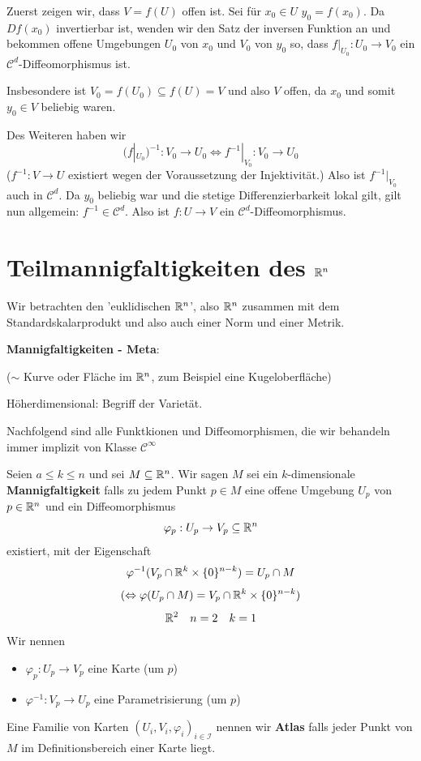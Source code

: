 \documentclass[main.tex]{subfiles}
\begin{document}
\begin{Beweis}
  Zuerst zeigen wir, dass $V = f(U)$ offen ist. Sei für $x_0 \in U$ $y_0 = f(x_0)$. Da $Df(x_0)$ invertierbar ist, wenden wir den Satz der inversen Funktion an und bekommen offene Umgebungen $U_0$ von $x_0$ und $V_0$ von $y_0$ so, dass $f|_{U_0} : U_0 \to V_0$ ein $\mathcal{C}^d$-Diffeomorphismus ist.

  Insbesondere ist $V_0 = f(U_0) \subseteq f(U) = V$ und also $V$ offen, da $x_0$ und somit $y_0 \in V$ beliebig waren.

  Des Weiteren haben wir
  $$(f|_{U_0})^{-1}: V_0 \to U_0 \Leftrightarrow f^{-1}|_{V_0}: V_0 \to U_0$$
  ($f^{-1}: V \to U$ existiert wegen der Voraussetzung der Injektivität.) Also ist $f^{-1}|_{V_0}$ auch in $\mathcal{C}^d$. Da $y_0$ beliebig war und die stetige Differenzierbarkeit lokal gilt, gilt nun allgemein: $f^{-1} \in \mathcal{C}^d$. Also ist $f: U \to V$ ein $\mathcal{C}^d$-Diffeomorphismus.
\end{Beweis}


\section{Teilmannigfaltigkeiten des $\mathbb{R}^n$}

Wir betrachten den 'euklidischen $\mathbb{R}^n$', also $\mathbb{R}^n$ zusammen mit dem Standardskalarprodukt und also auch einer Norm und einer Metrik.

\begin{Bemerkung}
  \textbf{Mannigfaltigkeiten - Meta}:

  ($\sim$ Kurve oder Fläche im $\mathbb{R}^n$, zum Beispiel eine Kugeloberfläche)

  Höherdimensional: Begriff der Varietät.
\end{Bemerkung}

\begin{Bemerkung}[Voraussetzung]
  Nachfolgend sind alle Funktkionen und Diffeomorphismen, die wir behandeln immer implizit von Klasse $\mathcal{C}^\infty$
\end{Bemerkung}

\begin{Definition}[Mannigfaltigkeit]
  Seien $a \leq k \leq n$ und sei $M \subseteq \mathbb{R}^n$. Wir sagen $M$ sei ein $k$-dimensionale \textbf{Mannigfaltigkeit} falls zu jedem Punkt $p \in M$ eine offene Umgebung $U_p$ von $p \in \mathbb{R}^n$ und ein Diffeomorphismus
  $$\varphi_p : U_p \to V_p \subseteq \mathbb{R}^n$$
  existiert, mit der Eigenschaft
  $$\varphi^{-1} (V_p \cap \mathbb{R}^k \times \{0\}^{n-k}) = U_p \cap M$$
  $$(\Leftrightarrow \varphi(U_p \cap M) = V_p \cap \mathbb{R}^{k} \times \{0\}^{n-k})$$
  $$\mathbb{R}^2 \quad n = 2 \quad k = 1$$
  Wir nennen
  \begin{itemize}
    \item $\varphi_p: U_p \to V_p$ eine Karte (um $p$)
    \item $\varphi^{-1}: V_p \to U_p$ eine Parametrisierung (um $p$)
  \end{itemize}
  Eine Familie von Karten $(U_i, V_i, \varphi_i)_{i \in \mathcal{I}}$ nennen wir \textbf{Atlas} falls jeder Punkt von $M$ im Definitionsbereich einer Karte liegt.
\end{Definition}
\end{document}

